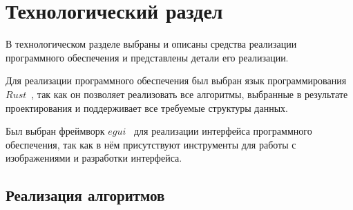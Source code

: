 \chapter{Технологический раздел}
В технологическом разделе выбраны и описаны средства реализации программного обеспечения и представлены детали его реализации.

Для реализации программного обеспечения был выбран язык программирования $Rust$~\cite{rust2024}, так как он позволяет реализовать все алгоритмы, выбранные в результате проектирования и поддерживает все требуемые структуры данных.

Был выбран фреймворк $egui$~\cite{egui2024} для реализации интерфейса программного обеспечения, так как в нём присутствуют инструменты для работы с изображениями и разработки интерфейса.

\section{Реализация алгоритмов}

